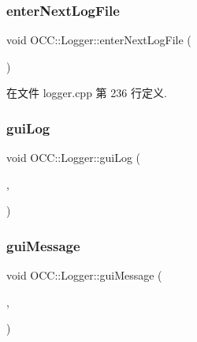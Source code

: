 \subsubsection{\texorpdfstring{enter\+Next\+Log\+File}{enterNextLogFile}}
{\footnotesize\ttfamily void O\+C\+C\+::\+Logger\+::enter\+Next\+Log\+File (\begin{DoxyParamCaption}{ }\end{DoxyParamCaption})\hspace{0.3cm}{\ttfamily [slot]}}



在文件 logger.\+cpp 第 236 行定义.

\mbox{\label{class_o_c_c_1_1_logger_a45e0121f6b406973c6cbedfe5f21fa9c}} 
\subsubsection{\texorpdfstring{gui\+Log}{guiLog}}
{\footnotesize\ttfamily void O\+C\+C\+::\+Logger\+::gui\+Log (\begin{DoxyParamCaption}\item[{const Q\+String \&}]{,  }\item[{const Q\+String \&}]{ }\end{DoxyParamCaption})\hspace{0.3cm}{\ttfamily [signal]}}

\mbox{\label{class_o_c_c_1_1_logger_a37d442a31a0d3dec51f3a1b279c9bcbe}} 
\subsubsection{\texorpdfstring{gui\+Message}{guiMessage}}
{\footnotesize\ttfamily void O\+C\+C\+::\+Logger\+::gui\+Message (\begin{DoxyParamCaption}\item[{const Q\+String \&}]{,  }\item[{const Q\+String \&}]{ }\end{DoxyParamCaption})\hspace{0.3cm}{\ttfamily [signal]}}

\mbox{\label{class_o_c_c_1_1_logger_ac34876737f0f21499f57bfe2a09e758c}} 
